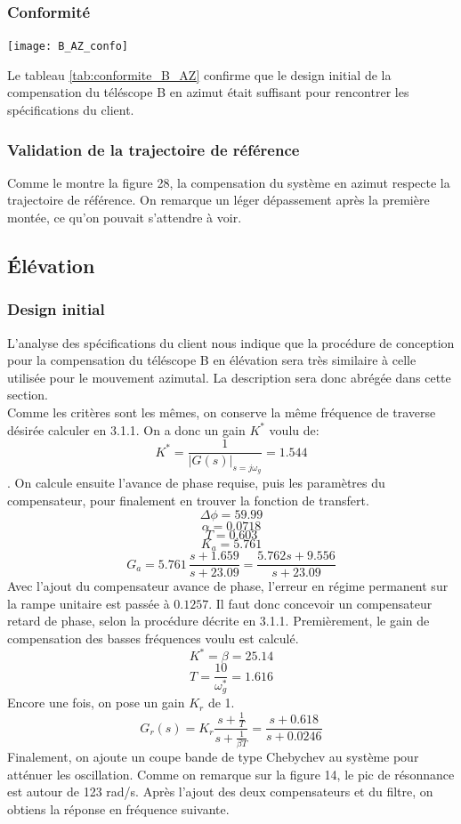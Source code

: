 \documentclass{udes_rapport} %
\begin{document}
\subsubsection{Conformité}
\begin{center}
  \label{tab:conformite_B_AZ}
  \texttt{[image: B\_AZ\_confo]}
\end{center}

Le tableau \ref{tab:conformite_B_AZ} confirme que le design initial de la compensation du téléscope B en azimut était suffisant pour rencontrer les spécifications du client.
\subsubsection{Validation de la trajectoire de référence}
Comme le montre la figure 28, la compensation du système en azimut respecte la trajectoire de référence. On remarque un léger dépassement après la première montée, ce qu'on pouvait s'attendre à voir.

\subsection{Élévation}
\subsubsection{Design initial}
L'analyse des spécifications du client nous indique que la procédure de conception pour la compensation du téléscope B en élévation sera très similaire à celle utilisée pour le mouvement azimutal. La description sera donc abrégée dans cette section.\\
Comme les critères sont les mêmes, on conserve la même fréquence de traverse désirée calculer en 3.1.1. On a donc un gain $K^*$ voulu de:
\[K^* = \frac{1}{|G(s)|_{s=j\omega_g}} = 1.544\].
On calcule ensuite l'avance de phase requise, puis les paramètres du compensateur, pour finalement en trouver la fonction de transfert. 
\[ \Delta \phi = 59.99\] 
\[\alpha = 0.0718\]
\[ T = 0.603\]
\[ K_a = 5.761\]
\[ G_a = 5.761\,\frac{s+1.659}{s+23.09}=\frac{5.762s+9.556}{s+23.09}\]
Avec l'ajout du compensateur avance de phase, l'erreur en régime permanent sur la rampe unitaire est passée à $0.1257$. Il faut donc concevoir un compensateur retard de phase, selon la procédure décrite en 3.1.1. Premièrement, le gain de compensation des basses fréquences voulu est calculé.
\[K^* = \beta = 25.14\]
\[T = \frac{10}{\omega_g^*} = 1.616 \]
Encore une fois, on pose un gain $K_r$ de 1.
\[ G_r(s)=K_r\frac{s+\frac{1}{T}}{s+\frac{1}{\beta T}} = \frac{s + 0.618}{s + 0.0246} \]
Finalement, on ajoute un coupe bande de type Chebychev au système pour atténuer les oscillation. Comme on remarque sur la figure 14, le pic de résonnance est autour de 123 rad/s. Après l'ajout des deux compensateurs et du filtre, on obtiens la réponse en fréquence suivante.
\end{document}
